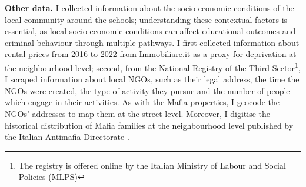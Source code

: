 \documentclass[12pt]{article}
\theoremstyle{plain}
\theoremstyle{plain}
\theoremstyle{plain}
\theoremstyle{definition}
\theoremstyle{plain}
\theoremstyle{definition}
\theoremstyle{plain}
\theoremstyle{remark}
\theoremstyle{definition}
\theoremstyle{definition}
\theoremstyle{plain}
\begin{document}
\textbf{Other data.} I collected information about the socio-economic conditions of the local community around the schools; understanding these contextual factors is essential, as local socio-economic conditions can affect educational outcomes and criminal behaviour through multiple pathways. I first collected information about rental prices from 2016 to 2022 from \href{https://www.immobiliare.it/}{Immobiliare.it} as a proxy for deprivation at the neighbourhood level; second, from the \href{https://servizi.lavoro.gov.it/runts/it-it/}{National Registry of the Third Sector}\footnote{The registry is offered online by the Italian Ministry of Labour and Social Policies (MLPS)}, I scraped information about local NGOs, such as their legal address, the time the NGOs were created, the type of activity they pursue and the number of people which engage in their activities. As with the Mafia properties, I geocode the NGOs' addresses to map them at the street level. Moreover, I digitise the historical distribution of Mafia families at the neighbourhood level published by the Italian Antimafia Directorate \citet{dia_relazione_2015-1, dia_relazione_2015}.\par
\vspace{1cm}
\end{document}
